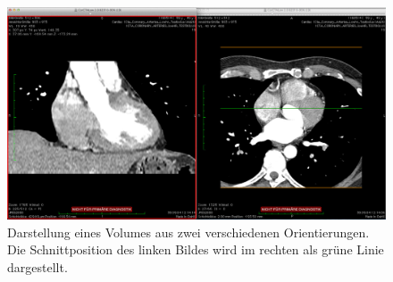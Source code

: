 \begin{figure}[t]
	\centering
	\includegraphics[width=0.8\linewidth]{img/c2_osirix_2d_view_splitscreen.jpg}
	\caption{Darstellung eines Volumes aus zwei verschiedenen Orientierungen. Die Schnittposition des linken Bildes wird im rechten als grüne Linie dargestellt.}
	\label{fig:osirix_2dView_splitWindow}
\end{figure}

